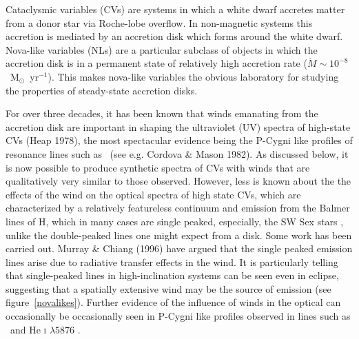 \documentclass[preprint, a4paper, 11pt]{aastex}
\begin{document}
Cataclysmic variables (CVs) are systems in which a white dwarf accretes matter from a donor
star via Roche-lobe overflow. In non-magnetic systems this accretion
is mediated by an accretion disk which forms around the white dwarf. 
Nova-like variables (NLs) are a particular subclass of objects in which the accretion disk
is in a permanent state of relatively high accretion rate 
($\dot{M} \sim 10^{-8}$~M$_{\odot}$~yr$^{-1}$).  This makes nova-like variables the obvious
laboratory for studying the properties of steady-state accretion disks.

For over three decades, it has been known that winds emanating from the accretion disk
are important in shaping the ultraviolet (UV) spectra of high-state CVs (Heap 1978), 
the most spectacular evidence being the P-Cygni like profiles of resonance lines such as 
\civfull\ (see e.g. Cordova \& Mason 1982\nocite{cordova1982}).  
As discussed below, it is now possible to produce synthetic spectra 
of CVs with winds that are qualitatively very similar to those observed.  
However, less is known about the the effects of the wind on the optical spectra of high state CVs, 
which are characterized by a relatively featureless continuum and  emission from the
Balmer lines of H, which in many cases are single peaked, especially, the SW Sex stars \citep{HSK86, DR95}, unlike the double-peaked lines one might expect from a disk.   Some work has been carried out.
Murray \& Chiang (1996) have argued that the single peaked emission lines arise 
due to radiative transfer effects in the wind.
It is particularly telling that single-peaked 
lines in high-inclination systems can be seen even in eclipse, suggesting 
that a spatially extensive wind may be the source of emission (see figure~\ref{novalikes}).
Further evidence of the influence of winds in the optical can occasionally 
be occasionally seen in P-Cygni like profiles observed in lines such as \ha\ 
and He \textsc{i} $\lambda5876$ \citep{RN98}.
\end{document}
